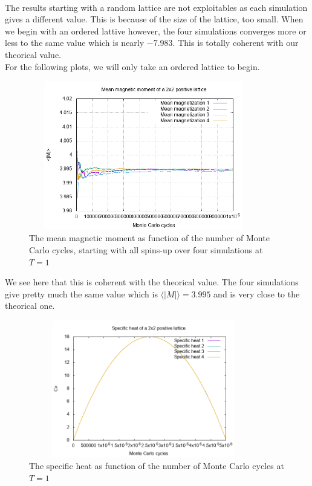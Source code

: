 \documentclass[a4paper, twoside, 11pt]{report}
\theoremstyle{theorem}
\theoremstyle{remark}
\theoremstyle{exemple}
\begin{document}
            \paragraph{}The results starting with a random lattice are not exploitables as each simulation gives a different value. This is because of the size of the lattice, too small. When we begin with an ordered lattive however, the four simulations converges more or less to the same value which is nearly $-7.983$. This is totally coherent with our theorical value. \\
            For the following plots, we will only take an ordered lattice to begin.
                \begin{center}
                \begin{figure}[h!]
                    \centering
                    \includegraphics[width=10cm,height=6.5cm]{Results/B/T=1/Plots/Moments_positive}
                    \caption{The mean magnetic moment as function of the number of Monte Carlo cycles, starting with all spins-up over four simulations at $T=1$}
                \end{figure}
                \end{center}
            We see here that this is coherent with the theorical value. The four simulations give pretty much the same value which is $\langle |M| \rangle = 3.995$ and is very close to the theorical one.
                \begin{center}
                \begin{figure}[h!]
                    \centering
                    \includegraphics[width=10cm,height=6cm]{Results/B/T=1/Plots/Cv}
                    \caption{The specific heat as function of the number of Monte Carlo cycles at $T=1$}
                \end{figure}
                \end{center}
                
\end{document}
